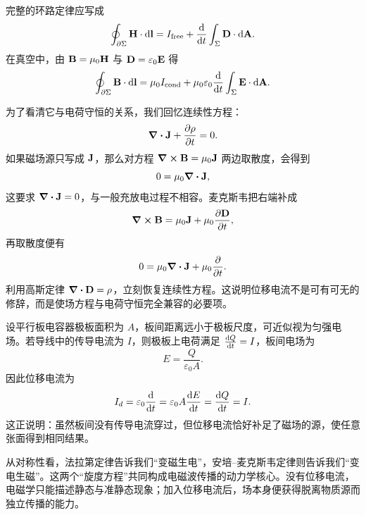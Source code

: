 \begin{law}[安培--麦克斯韦定律的积分形式]
完整的环路定律应写成
\[
\oint_{\partial \Sigma} \vb{H}\cdot \dd \vb{l}
= I_{\text{free}}+\dv{}{t}\int_{\Sigma}\vb{D}\cdot \dd\vb{A}.
\]
在真空中，由 $\vb{B}=\mu_0\vb{H}$ 与 $\vb{D}=\varepsilon_0\vb{E}$ 得
\[
\oint_{\partial \Sigma} \vb{B}\cdot \dd \vb{l}
=\mu_0 I_{\text{cond}}+\mu_0\varepsilon_0\dv{}{t}\int_{\Sigma}\vb{E}\cdot \dd\vb{A}.
\]
\end{law}

为了看清它与电荷守恒的关系，我们回忆连续性方程：
\[
\div \vb{J}+\pdv{\rho}{t}=0.
\]
如果磁场源只写成 $\vb{J}$，那么对方程 $\curl \vb{B}=\mu_0\vb{J}$ 两边取散度，会得到
\[
0=\mu_0\div \vb{J},
\]
这要求 $\div \vb{J}=0$，与一般充放电过程不相容。麦克斯韦把右端补成
\[
\curl \vb{B}=\mu_0\vb{J}+\mu_0\pdv{\vb{D}}{t},
\]
再取散度便有
\[
0=\mu_0\div\vb{J}+\mu_0\pdv{}{t}(\div\vb{D}).
\]
利用高斯定律 $\div\vb{D}=\rho$，立刻恢复连续性方程。这说明位移电流不是可有可无的修辞，而是使场方程与电荷守恒完全兼容的必要项。

\begin{example}[充电电容器中的位移电流]
设平行板电容器极板面积为 $A$，板间距离远小于极板尺度，可近似视为匀强电场。若导线中的传导电流为 $I$，则极板上电荷满足 $\dv{Q}{t}=I$，板间电场为
\[
E=\frac{Q}{\varepsilon_0 A}.
\]
因此位移电流为
\[
I_d=\varepsilon_0\dv{}{t}(EA)=\varepsilon_0 A \dv{E}{t}
=\dv{Q}{t}=I.
\]
这正说明：虽然板间没有传导电流穿过，但位移电流恰好补足了磁场的源，使任意张面得到相同结果。
\end{example}

\begin{remark}
从对称性看，法拉第定律告诉我们“变磁生电”，安培--麦克斯韦定律则告诉我们“变电生磁”。这两个“旋度方程”共同构成电磁波传播的动力学核心。没有位移电流，电磁学只能描述静态与准静态现象；加入位移电流后，场本身便获得脱离物质源而独立传播的能力。
\end{remark}

\begin{center}
\end{center}

